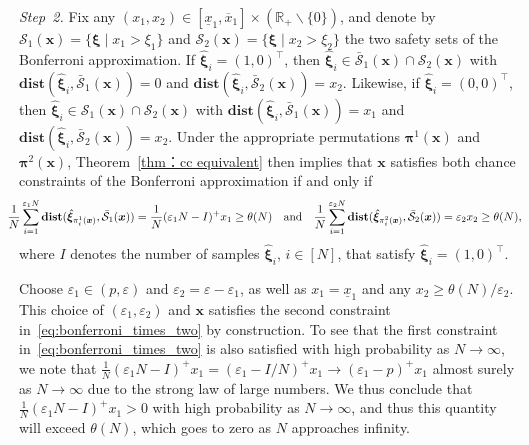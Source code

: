 \documentclass[nonblindrev]{informs2017}
\newcommand{\bmh}[1]{\hat{\bm{#1}}}
\newcommand{\1}[1]{\mathds{1}{\left(#1\right)}}
\begin{document}
{\em Step~2.} 
Fix any $(x_1,x_2) \in [\underline{x}_1, \overline{x}_1]\times (\mathbb R_+\backslash\{0\})$, and denote by $\mathcal{S}_1(\bm{x}) = \{\bm{\xi} \mid x_1 > \xi_1 \}$ and $\mathcal{S}_2(\bm{x}) = \{\bm{\xi} \mid x_2 > \xi_2 \}$ the two safety sets of the Bonferroni approximation. If $\bmh{\xi}_i = (1, 0)^\top$, then $\bmh{\xi}_i \in \bar{\mathcal{S}}_1(\bm{x}) \cap \mathcal{S}_2(\bm{x})$ with $\mathbf{dist}(\bmh{\xi}_i, \bar{\mathcal{S}}_1(\bm{x})) = 0$ and $\mathbf{dist}(\bmh{\xi}_i, \bar{\mathcal{S}}_2(\bm{x})) = x_2$. Likewise, if $\bmh{\xi}_i = (0, 0)^\top$, then $\bmh{\xi}_i \in \mathcal{S}_1(\bm{x}) \cap \mathcal{S}_2(\bm{x})$ with $\mathbf{dist}(\bmh{\xi}_i, \bar{\mathcal{S}}_1(\bm{x})) = x_1$ and $\mathbf{dist}(\bmh{\xi}_i, \bar{\mathcal{S}}_2(\bm{x})) = x_2$. Under the appropriate permutations $\bm{\pi}^1 (\bm{x})$ and $\bm{\pi}^2 (\bm{x})$, Theorem~\ref{thm：cc equivalent} then implies that $\bm{x}$ satisfies both chance constraints of the Bonferroni approximation if and only if
\begin{equation}\label{eq:bonferroni_times_two}
\mspace{-20mu}
\dfrac{1}{N} \sum_{i = 1}^{\varepsilon_1 N}\mathbf{dist}(\bmh{\xi}_{\pi^1_i(\bm{x})}, \bar{\mathcal{S}}_1(\bm{x})) = \dfrac{1}{N}(\varepsilon_1 N - I)^+ x_1 \geq \theta(N)
\quad \text{and} \quad
\dfrac{1}{N} \sum_{i = 1}^{\varepsilon_2 N}\mathbf{dist}(\bmh{\xi}_{\pi^2_i(\bm{x})}, \bar{\mathcal{S}}_2(\bm{x})) = \varepsilon_2 x_2 \geq \theta(N),
\end{equation}
where $I$ denotes the number of samples $\bmh{\xi}_i$, $i \in [N]$, that satisfy $\bmh{\xi}_i = (1, 0)^\top$.

Choose $\varepsilon_1 \in (p, \varepsilon)$ and $\varepsilon_2 = \varepsilon - \varepsilon_1$, as well as $x_1 = \underline{x}_1$ and any $x_2 \geq \theta(N)/ \varepsilon_2$. This choice of $(\varepsilon_1, \varepsilon_2)$ and $\bm{x}$ satisfies the second constraint in~\eqref{eq:bonferroni_times_two} by construction. To see that the first constraint in~\eqref{eq:bonferroni_times_two} is also satisfied with high probability as $N \to \infty$, we note that $\frac{1}{N}(\varepsilon_1 N - I)^+ x_1 = (\varepsilon_1 - I/N)^+ x_1 \to (\varepsilon_1 - p)^+ x_1$ almost surely as $N \to \infty$ due to the strong law of large numbers. We thus conclude that $\frac{1}{N}(\varepsilon_1 N - I)^+ x_1 > 0$ with high probability as $N \to \infty$, and thus this quantity will exceed $\theta(N)$, which goes to zero as $N$ approaches infinity.
\end{document}
